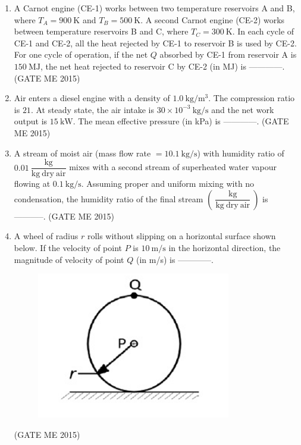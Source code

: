 \documentclass[journal]{IEEEtran}
\begin{document}
\begin{enumerate}
\item A Carnot engine (CE-1) works between two temperature reservoirs A and B, where $T_{A}=900\ \mathrm{K}$ and
$T_{B}=500\ \mathrm{K}$. A second Carnot engine (CE-2) works between temperature reservoirs B and C, where
$T_{C}=300\ \mathrm{K}$. In each cycle of CE-1 and CE-2, all the heat rejected by CE-1 to reservoir B is used by CE-2.
For one cycle of operation, if the net $Q$ absorbed by CE-1 from reservoir A is $150\ \mathrm{MJ}$, the net heat rejected
to reservoir C by CE-2 (in MJ) is ------------.
\hfill  (GATE ME 2015)

\item Air enters a diesel engine with a density of $1.0\ \mathrm{kg/m^{3}}$. The compression ratio is $21$.
At steady state, the air intake is $30\times 10^{-3}\ \mathrm{kg/s}$ and the net work output is $15\ \mathrm{kW}$.
The mean effective pressure (in kPa) is ------------.
\hfill  (GATE ME 2015)

\item A stream of moist air (mass flow rate $=10.1\ \mathrm{kg/s}$) with humidity ratio of
$0.01\ \dfrac{\mathrm{kg}}{\mathrm{kg\ dry\ air}}$ mixes with a second stream of superheated water vapour flowing at
$0.1\ \mathrm{kg/s}$. Assuming proper and uniform mixing with no condensation, the humidity ratio of the final stream
$\left(\ \dfrac{\mathrm{kg}}{\mathrm{kg\ dry\ air}}\ \right)$ is -----------.
\hfill  (GATE ME 2015)

\item A wheel of radius $r$ rolls without slipping on a horizontal surface shown below. If the velocity of point $P$
is $10\ \mathrm{m/s}$ in the horizontal direction, the magnitude of velocity of point $Q$ (in m/s) is ------------.
\begin{figure}[H]
    \centering
    \includegraphics[width=0.8\textwidth]{Fig 2.png}
    \caption{}
    \label{fig:question23}
\end{figure}
\hfill  (GATE ME 2015)


\end{enumerate}
\end{document}
